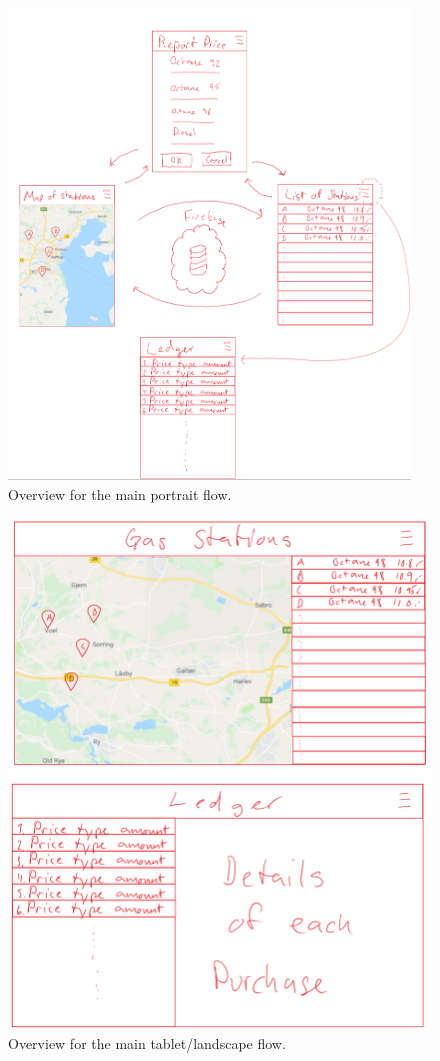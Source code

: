 \begin{figure}[h]
	\centering
	\includegraphics[width=0.95\textwidth]{P.png}
	\caption{Overview for the main portrait flow.}
	\label{fig:p}
\end{figure}

\begin{figure}[h]
	\centering
	\includegraphics[width=\textwidth]{L.png}
	\caption{Overview for the main tablet/landscape flow.}
	\label{fig:l}
\end{figure}
